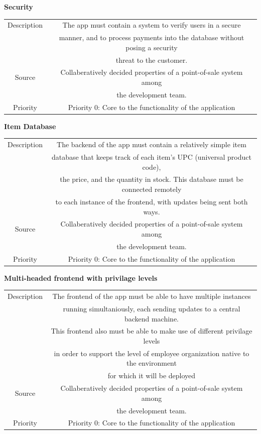 \begin{center}
\textbf{Security}\\
\begin{tabular}{|c|c|}\hline
Description & The app must contain a system to verify users in a secure \\
& manner, and to process payments into the database without posing a security \\
& threat to the customer. \\ \hline
Source & Collaberatively decided properties of a point-of-sale system among \\
& the development team. \\ \hline
Priority & Priority 0: Core to the functionality of the application \\ \hline
\end{tabular}\vspace{2em}

\textbf{Item Database}\\
\begin{tabular}{|c|c|}\hline
Description & The backend of the app must contain a relatively simple item \\
& database that keeps track of each item's UPC (universal product code),\\
& the price, and the quantity in stock. This database must be connected remotely\\
& to each instance of the frontend, with updates being sent both ways. \\ \hline
Source & Collaberatively decided properties of a point-of-sale system among \\
& the development team. \\ \hline
Priority & Priority 0: Core to the functionality of the application \\ \hline

\end{tabular}\vspace{2em}

\textbf{Multi-headed frontend with privilage levels}\\
\begin{tabular}{|c|c|}\hline
  Description & The frontend of the app must be able to have multiple instances\\
  & running simultaniously, each sending updates to a central backend machine.\\
  & This frontend also must be able to make use of different privilage levels\\
  & in order to support the level of employee organization native to the environment\\
  & for which it will be deployed \\ \hline
  Source & Collaberatively decided properties of a point-of-sale system among \\
  & the development team. \\ \hline
  Priority & Priority 0: Core to the functionality of the application \\ \hline
\end{tabular}
\end{center}

